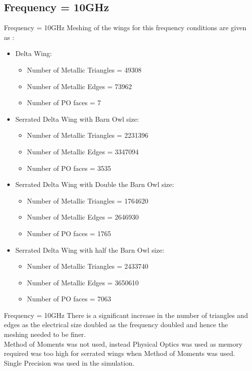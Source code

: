 \documentclass{beamer}
\begin{document}
\subsection{Frequency = 10GHz}
\begin{frame}{Frequency = 10GHz}
Meshing of the wings for this frequency conditions are given as :
\begin{itemize}
\item Delta Wing:
\begin{itemize}
	\item Number of Metallic Triangles = 49308
	\item Number of Metallic Edges = 73962
	\item Number of PO faces = 7
\end{itemize}
\item Serrated Delta Wing with Barn Owl size:
\begin{itemize}
\item Number of Metallic Triangles = 2231396
\item Number of Metallic Edges = 3347094
\item Number of PO faces = 3535
\end{itemize}
\item Serrated Delta Wing with Double the Barn Owl size:
\begin{itemize}
\item Number of Metallic Triangles = 1764620
\item Number of Metallic Edges = 2646930
\item Number of PO faces = 1765
\end{itemize}
\item Serrated Delta Wing with half the Barn Owl size:
\begin{itemize}
\item Number of Metallic Triangles = 2433740
\item Number of Metallic Edges = 3650610
\item Number of PO faces = 7063
\end{itemize}
\end{itemize}
\end{frame}

\begin{frame}{Frequency = 10GHz}
\justifying
There is a significant increase in the number of triangles and edges as the electrical size doubled as the frequency doubled and hence the meshing needed to be finer.\\[0.2in]
Method of Moments was not used, instead Physical Optics was used as memory required was too high for serrated wings when Method of Moments was used. Single Precision was used in the simulation.\\
\end{frame}
\end{document}
